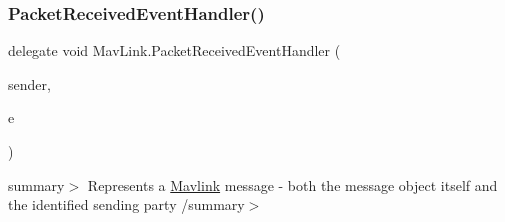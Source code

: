 \subsubsection{\texorpdfstring{PacketReceivedEventHandler()}{PacketReceivedEventHandler()}}
{\footnotesize\ttfamily delegate void Mav\+Link.\+Packet\+Received\+Event\+Handler (\begin{DoxyParamCaption}\item[{object}]{sender,  }\item[{\mbox{\hyperlink{classMavLink_1_1MavlinkPacket}{Mavlink\+Packet}}}]{e }\end{DoxyParamCaption})}

summary$>$ Represents a \mbox{\hyperlink{classMavLink_1_1Mavlink}{Mavlink}} message -\/ both the message object itself and the identified sending party /summary$>$ 